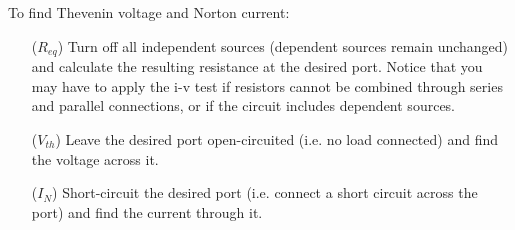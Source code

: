 \documentclass[twocolumn]{article}
\begin{document}
\hrulefill\\\\
To find Thevenin voltage and Norton current:
\begin{itemize}
    \item[($R_{eq}$)] Turn off all independent sources (dependent
    sources remain unchanged) and calculate the resulting resistance at the
    desired port. Notice that you may have to apply the i-v test if resistors
    cannot be combined through series and parallel connections, or if the
    circuit includes dependent sources.
    \item[($V_{th}$)] Leave the desired port open-circuited
    (i.e. no load connected) and find the voltage across it.
    \item[($I_N$)] Short-circuit the desired port (i.e. connect
    a short circuit across the port) and find the current through it. 
\end{itemize}
\end{document}
